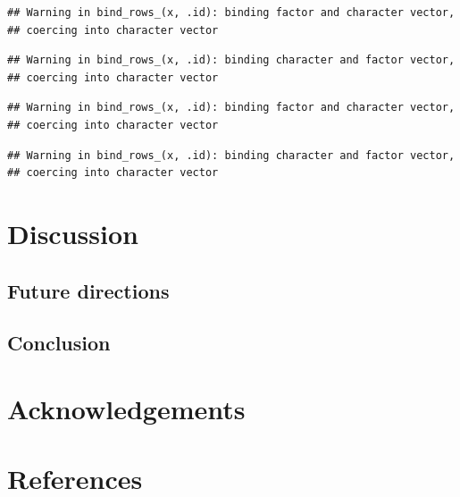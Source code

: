 \documentclass[floatsintext,man]{apa6}
\theoremstyle{definition}
\theoremstyle{definition}
\theoremstyle{definition}
\theoremstyle{remark}
\begin{document}
\begin{verbatim}
## Warning in bind_rows_(x, .id): binding factor and character vector,
## coercing into character vector
\end{verbatim}

\begin{verbatim}
## Warning in bind_rows_(x, .id): binding character and factor vector,
## coercing into character vector
\end{verbatim}

\begin{verbatim}
## Warning in bind_rows_(x, .id): binding factor and character vector,
## coercing into character vector
\end{verbatim}

\begin{verbatim}
## Warning in bind_rows_(x, .id): binding character and factor vector,
## coercing into character vector
\end{verbatim}

\section{Discussion}\label{disc}

\subsection{Future directions}\label{disc-future}

\subsection{Conclusion}\label{disc-conclusion}

\section{Acknowledgements}\label{acknowledgements}

\newpage

\section{References}\label{refs}

\begingroup
\setlength{\parindent}{-0.5in} \setlength{\leftskip}{0.5in}

\hypertarget{refs}{}

\endgroup
\end{document}

